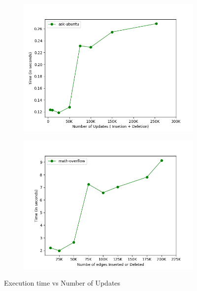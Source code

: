 \documentclass[a4paper]{article}
\begin{document}
\begin{figure}[H]
\begin{subfigure}[b]{0.45\textwidth}
         \caption{}
         \label{fig:dynamic_trend_2}
    \end{subfigure}
    \hfill
    \begin{subfigure}[b]{0.45\textwidth}
         \centering
         \includegraphics[width=\textwidth]{img/dyn/u3.png}
         \caption{}
         \label{fig:dynamic_trend_3}
    \end{subfigure}
    \hfill
    \begin{subfigure}[b]{0.45\textwidth}
         \centering
         \includegraphics[width=\textwidth]{img/dyn/u4.png}
         \caption{}
         \label{fig:dynamic_trend_4}
    \end{subfigure}
    \caption{Execution time vs Number of Updates}
    \label{fig:dynamic_trend}
\end{figure}
\end{document}
